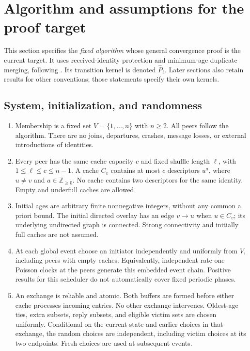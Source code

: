 \documentclass[11pt]{article}
\begin{document}
\section{Algorithm and assumptions for the proof target}
\label{sec:target}

This section specifies the \emph{fixed algorithm} whose general
convergence proof is the current target. It uses received-identity
protection and minimum-age duplicate merging, following
\cite[Figure 2.3, p.~19]{cyclonthesis}. Its transition kernel is
denoted $\widehat P_\ell$. Later sections also retain results for
other conventions; those statements specify their own kernels.

\subsection{System, initialization, and randomness}
\begin{enumerate}
\item Membership is a fixed set $V=\{1,\ldots,n\}$ with $n\ge2$.
All peers follow the algorithm. There are no joins, departures,
crashes, message losses, or external introductions of identities.
\item Every peer has the same cache capacity $c$ and fixed shuffle
length $\ell$, with $1\le\ell\le c\le n-1$. A cache $C_v$
contains at most $c$ descriptors $u^a$, where $u\ne v$ and
$a\in\mathbb Z_{\ge0}$. No cache contains two descriptors for
the same identity. Empty and underfull caches are allowed.
\item Initial ages are arbitrary finite nonnegative integers,
without any common a priori bound. The initial directed overlay
has an edge $v\to u$ when $u\in C_v$; its underlying undirected
graph is connected. Strong connectivity and initially full caches
are not assumed.
\item At each global event choose an initiator independently and
uniformly from $V$, including peers with empty caches. Equivalently,
independent rate-one Poisson clocks at the peers generate this
embedded event chain. Positive results for this scheduler do not
automatically cover fixed periodic phases.
\item An exchange is reliable and atomic. Both buffers are formed
before either cache processes incoming entries. No other exchange
intervenes. Oldest-age ties, extra subsets, reply subsets, and
eligible victim sets are chosen uniformly. Conditional on the
current state and earlier choices in that exchange, the random
choices are independent, including victim choices at its two
endpoints. Fresh choices are used at subsequent events.
\end{enumerate}
\end{document}
